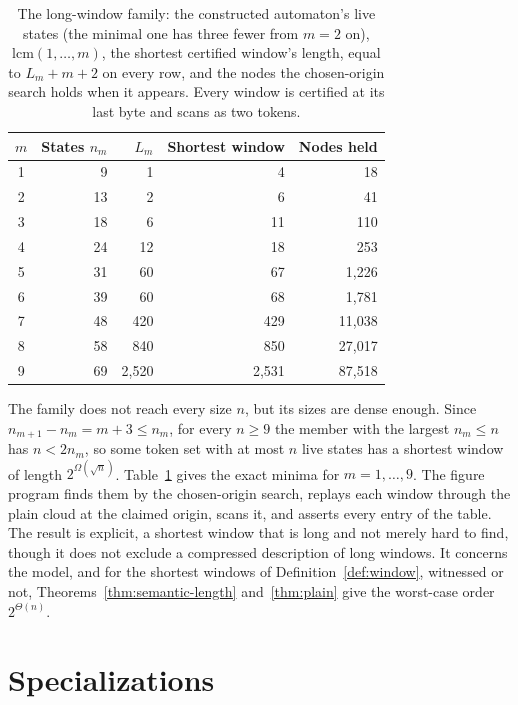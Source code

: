 \documentclass[11pt,a4paper]{article}
\theoremstyle{definition}
\theoremstyle{plain}
\begin{document}
\begin{table}
\centering
\caption{The long-window family: the constructed automaton's live states (the minimal one has three fewer from $m = 2$
on), $\mathrm{lcm}(1, \ldots, m)$, the shortest certified window's length, equal to $L_m + m + 2$ on every row, and the
nodes the chosen-origin search holds when it appears. Every window is certified at its last byte and scans as two
tokens.}
\label{tab:family}
\begin{tabular}{crrrr}
\toprule
$m$ & States $n_m$ & $L_m$ & Shortest window & Nodes held \\
\midrule
1 & 9 & 1 & 4 & 18 \\
2 & 13 & 2 & 6 & 41 \\
3 & 18 & 6 & 11 & 110 \\
4 & 24 & 12 & 18 & 253 \\
5 & 31 & 60 & 67 & 1{,}226 \\
6 & 39 & 60 & 68 & 1{,}781 \\
7 & 48 & 420 & 429 & 11{,}038 \\
8 & 58 & 840 & 850 & 27{,}017 \\
9 & 69 & 2{,}520 & 2{,}531 & 87{,}518 \\
\bottomrule
\end{tabular}
\end{table}

The family does not reach every size $n$, but its sizes are dense enough. Since $n_{m+1} - n_m = m + 3 \leq n_m$, for
every $n \geq 9$ the member with the largest $n_m \leq n$ has $n < 2 n_m$, so some token set with at most $n$ live
states has a shortest window of length $2^{\Omega(\sqrt n)}$. Table~\ref{tab:family} gives the exact minima for
$m = 1, \ldots, 9$. The figure program finds them by the chosen-origin search, replays each window through the plain
cloud at the claimed origin, scans it, and asserts every entry of the table. The result is explicit, a shortest window
that is long and not merely hard to find, though it does not exclude a compressed description of long windows. It
concerns the model, and for the shortest windows of Definition~\ref{def:window}, witnessed or not,
Theorems~\ref{thm:semantic-length} and~\ref{thm:plain} give the worst-case order $2^{\Theta(n)}$.

\section{Specializations}
\label{sec:specialization}
\end{document}
